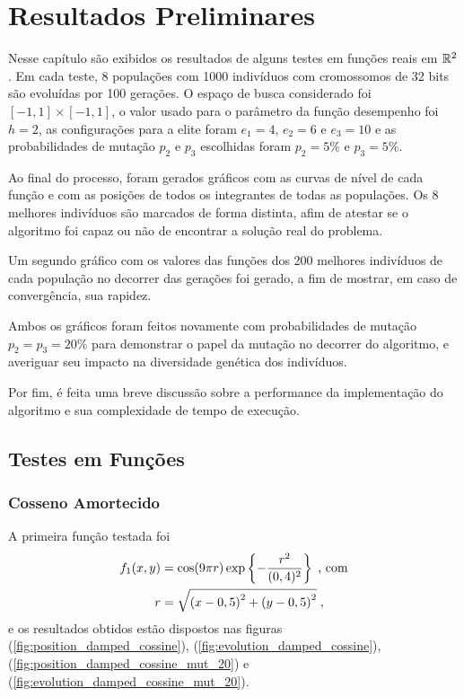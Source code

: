 \chapter{Resultados Preliminares}\label{cap_resultados}

Nesse capítulo são exibidos os resultados de alguns testes em funções reais em $\mathbb{R}^2$. Em cada teste, 
8 populações com 1000 indivíduos com cromossomos de 32 bits são evoluídas por 100 gerações. O espaço de busca
considerado foi $ [-1,1] \times [-1, 1] $, o valor usado para o parâmetro da função desempenho foi $h = 2$,
as configurações para a elite foram $e_1 = 4$, $e_2 = 6$ e $e_3 = 10$ e as probabilidades de mutação $p_2$ e $p_3$ escolhidas
foram $p_2 = 5\%$ e $p_3 = 5\%$.

Ao final do processo,
foram gerados gráficos com as curvas de nível de cada função e com as posições de todos os
integrantes de todas as populações. Os 8 melhores indivíduos são marcados de forma distinta,
afim de atestar se o algoritmo foi capaz ou não de encontrar a solução real do problema.

Um segundo gráfico com os valores das funções dos 200 melhores indivíduos de cada população
no decorrer das gerações foi gerado, a fim de mostrar, em caso de convergência, sua rapidez.

Ambos os gráficos foram feitos novamente com probabilidades de mutação $p_2 = p_3 = 20\%$
para demonstrar o papel da mutação no decorrer do algoritmo, e averiguar seu impacto na diversidade genética
dos indivíduos.

Por fim, é feita uma breve discussão sobre a performance da implementação do algoritmo e sua
complexidade de tempo de execução.

\section{Testes em Funções}

\subsection{Cosseno Amortecido}

A primeira função testada foi
\begin{align}
  \begin{split}    
    f_1(x,y) & = \cos(9\pi r)\exp\left\{-\frac{r^2}{(0,4)^2}\right\} \;\text{, com} \\
    r      & = \sqrt{
      \left(x - 0,5\right)^2 +
      \left(y - 0,5\right)^2
    } \;\mathrm{,}
  \end{split}
  \label{eq:func_damped_cossine}
\end{align}
e os resultados obtidos estão dispostos nas figuras (\ref{fig:position_damped_cossine}),
(\ref{fig:evolution_damped_cossine}), (\ref{fig:position_damped_cossine_mut_20}) e 
(\ref{fig:evolution_damped_cossine_mut_20}).

